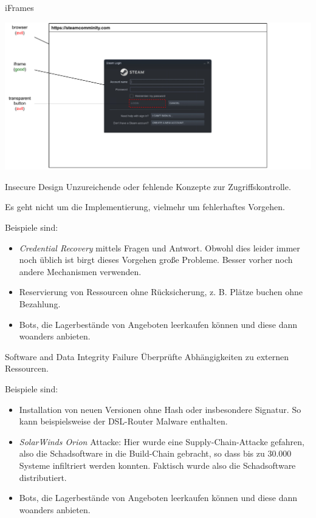 \begin{example}{iFrames}
    \begin{center}
        \includegraphics[width=\textwidth]{includes/figures/example_iframes.pdf}
    \end{center}
\end{example}

\begin{defi}{Insecure Design}
    Unzureichende oder fehlende Konzepte zur Zugriffskontrolle.

    Es geht nicht um die Implementierung, vielmehr um fehlerhaftes Vorgehen.

    Beispiele sind:
    \begin{itemize}
        \item \emph{Credential Recovery} mittels Fragen und Antwort.
              Obwohl dies leider immer noch üblich ist birgt dieses Vorgehen große Probleme.
              Besser vorher noch andere Mechanismen verwenden.
        \item Reservierung von Ressourcen ohne Rücksicherung, z. B. Plätze buchen ohne Bezahlung.
        \item Bots, die Lagerbestände von Angeboten leerkaufen können und diese dann woanders anbieten.
    \end{itemize}
\end{defi}

\begin{defi}{Software and Data Integrity Failure}
    Überprüfte Abhängigkeiten zu externen Ressourcen.

    Beispiele sind:
    \begin{itemize}
        \item Installation von neuen Versionen ohne Hash oder insbesondere Signatur.
              So kann beispielsweise der DSL-Router Malware enthalten.
        \item \emph{SolarWinds Orion} Attacke: Hier wurde eine Supply-Chain-Attacke gefahren, also die Schadsoftware in die Build-Chain gebracht, so dass bis zu 30.000 Systeme infiltriert werden konnten.
              Faktisch wurde also die Schadsoftware distributiert.
        \item Bots, die Lagerbestände von Angeboten leerkaufen können und diese dann woanders anbieten.
    \end{itemize}
\end{defi}


